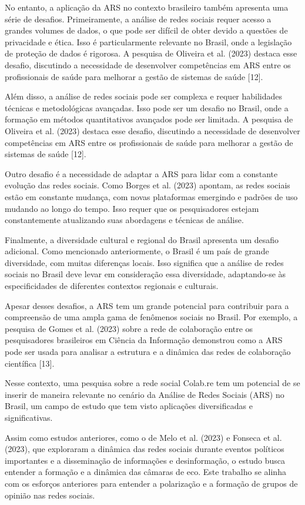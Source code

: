 No entanto, a aplicação da ARS no contexto brasileiro também apresenta uma série de desafios. Primeiramente, a análise de redes sociais requer acesso a grandes volumes de dados, o que pode ser difícil de obter devido a questões de privacidade e ética. Isso é particularmente relevante no Brasil, onde a legislação de proteção de dados é rigorosa. A pesquisa de Oliveira et al. (2023) destaca esse desafio, discutindo a necessidade de desenvolver competências em ARS entre os profissionais de saúde para melhorar a gestão de sistemas de saúde [12].

Além disso, a análise de redes sociais pode ser complexa e requer habilidades técnicas e metodológicas avançadas. Isso pode ser um desafio no Brasil, onde a formação em métodos quantitativos avançados pode ser limitada. A pesquisa de Oliveira et al. (2023) destaca esse desafio, discutindo a necessidade de desenvolver competências em ARS entre os profissionais de saúde para melhorar a gestão de sistemas de saúde [12].

Outro desafio é a necessidade de adaptar a ARS para lidar com a constante evolução das redes sociais. Como Borges et al. (2023) apontam, as redes sociais estão em constante mudança, com novas plataformas emergindo e padrões de uso mudando ao longo do tempo. Isso requer que os pesquisadores estejam constantemente atualizando suas abordagens e técnicas de análise.

Finalmente, a diversidade cultural e regional do Brasil apresenta um desafio adicional. Como mencionado anteriormente, o Brasil é um país de grande diversidade, com muitas diferenças locais. Isso significa que a análise de redes sociais no Brasil deve levar em consideração essa diversidade, adaptando-se às especificidades de diferentes contextos regionais e culturais.

Apesar desses desafios, a ARS tem um grande potencial para contribuir para a compreensão de uma ampla gama de fenômenos sociais no Brasil. Por exemplo, a pesquisa de Gomes et al. (2023) sobre a rede de colaboração entre os pesquisadores brasileiros em Ciência da Informação demonstrou como a ARS pode ser usada para analisar a estrutura e a dinâmica das redes de colaboração científica [13].

Nesse contexto, uma pesquisa sobre a rede social Colab.re tem um potencial de se inserir de maneira relevante no cenário da Análise de Redes Sociais (ARS) no Brasil, um campo de estudo que tem visto aplicações diversificadas e significativas.

Assim como estudos anteriores, como o de Melo et al. (2023) e Fonseca et al. (2023), que exploraram a dinâmica das redes sociais durante eventos políticos importantes e a disseminação de informações e desinformação, o estudo busca entender a formação e a dinâmica das câmaras de eco. Este trabalho se alinha com os esforços anteriores para entender a polarização e a formação de grupos de opinião nas redes sociais.

